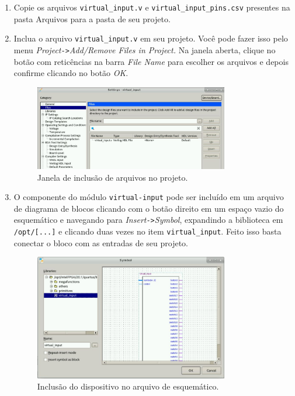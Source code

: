 \documentclass[12pt]{article}
\begin{document}
\begin{enumerate}[font=\bfseries]
    \item Copie os arquivos \verb|virtual_input.v| e \verb|virtual_input_pins.csv| presentes na pasta Arquivos para a pasta de seu projeto.
    
    \item Inclua o arquivo \verb|virtual_input.v| em seu projeto. Você pode fazer isso pelo menu \textit{Project}\verb|->|\textit{Add/Remove Files in Project.} Na janela aberta, clique no botão com reticências na barra \textit{File Name} para escolher os arquivos e depois confirme clicando no botão \textit{OK}.
    
    \begin{figure}[H]
    \centering
    \includegraphics[width=0.8\textwidth]{img/files-quartus.jpg}
    \caption{\label{ref:files-quartus}Janela de inclusão de arquivos no projeto.}
    \end{figure}
    
    \item O componente do módulo \verb|virtual-input| pode ser incluído em um arquivo de diagrama de blocos clicando com o botão direito em um espaço vazio do esquemático e navegando para \textit{Insert}\verb|->|\textit{Symbol}, expandindo a biblioteca em \verb|/opt/[...]| e clicando duas vezes no item \verb|virtual_input|. Feito isso basta conectar o bloco com as entradas de seu projeto.
    
    \begin{figure}[H]
    \centering
    \includegraphics[width=0.8\textwidth]{img/block-quartus.jpg}
    \caption{\label{ref:block-quartus}Inclusão do dispositivo no arquivo de esquemático.}
    \end{figure}
    

\end{enumerate}
\end{document}

